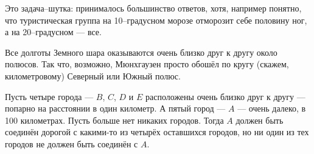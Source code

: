 \begin{itemize}
\itA Это задача–шутка: принималось большинство ответов, хотя, например понятно, что туристическая группа на 10--градусном морозе отморозит себе половину ног, а на 20--градусном — все.

\itB Все долготы Земного шара оказываются очень близко друг к другу около полюсов. Так что, возможно, Мюнхгаузен просто обошёл по кругу (скажем, километровому) Северный или Южный полюс.

\itC Пусть четыре города — $B$, $C$, $D$ и $E$ расположены очень близко друг к другу — попарно на расстоянии в один километр. А пятый город — $A$ — очень далеко, в 100 километрах. Пусть больше нет никаких городов. Тогда $A$ должен быть соединён дорогой с какими-то из  четырёх оставшихся городов, но ни один из тех городов не должен быть соединён с $A$.
\end{itemize}